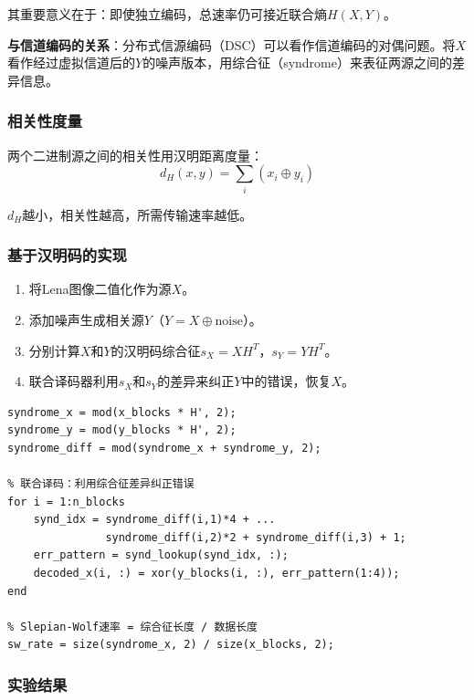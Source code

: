\documentclass[12pt, a4paper]{article}
\begin{document}
其重要意义在于：即使独立编码，总速率仍可接近联合熵$H(X,Y)$。

\textbf{与信道编码的关系}：分布式信源编码（DSC）可以看作信道编码的对偶问题。将$X$看作经过虚拟信道后的$Y$的噪声版本，用综合征（syndrome）来表征两源之间的差异信息。

\subsubsection{相关性度量}

两个二进制源之间的相关性用汉明距离度量：
\begin{equation}
d_H(x,y) = \sum_i (x_i \oplus y_i)
\label{eq:hamming_dist}
\end{equation}

$d_H$越小，相关性越高，所需传输速率越低。

\subsubsection{基于汉明码的实现}

\begin{enumerate}
    \item 将Lena图像二值化作为源$X$。
    \item 添加噪声生成相关源$Y$（$Y = X \oplus \text{noise}$）。
    \item 分别计算$X$和$Y$的汉明码综合征$s_X = XH^T$，$s_Y = YH^T$。
    \item 联合译码器利用$s_X$和$s_Y$的差异来纠正$Y$中的错误，恢复$X$。
\end{enumerate}

\begin{lstlisting}[caption=DSC基于汉明码的核心实现]
% 计算综合征
syndrome_x = mod(x_blocks * H', 2);
syndrome_y = mod(y_blocks * H', 2);
syndrome_diff = mod(syndrome_x + syndrome_y, 2);

% 联合译码：利用综合征差异纠正错误
for i = 1:n_blocks
    synd_idx = syndrome_diff(i,1)*4 + ...
               syndrome_diff(i,2)*2 + syndrome_diff(i,3) + 1;
    err_pattern = synd_lookup(synd_idx, :);
    decoded_x(i, :) = xor(y_blocks(i, :), err_pattern(1:4));
end

% Slepian-Wolf速率 = 综合征长度 / 数据长度
sw_rate = size(syndrome_x, 2) / size(x_blocks, 2);
\end{lstlisting}

\subsubsection{实验结果}
\end{document}
